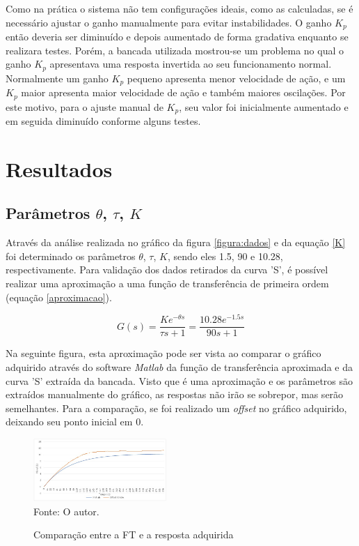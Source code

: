 \documentclass[12 pt,conference]{IEEEtran}
\begin{document}
    Como na prática o sistema não tem configurações ideais, como as calculadas, se é necessário ajustar o ganho manualmente para evitar instabilidades. O ganho $K_p$ então deveria ser diminuído e depois aumentado de forma gradativa enquanto se realizara testes. Porém, a bancada utilizada mostrou-se um problema no qual o ganho $K_p$ apresentava uma resposta invertida ao seu funcionamento normal. Normalmente um ganho $K_p$ pequeno apresenta menor velocidade de ação, e um $K_p$ maior apresenta maior velocidade de ação e também maiores oscilações. Por este motivo, para o ajuste manual de $K_p$, seu valor foi inicialmente aumentado e em seguida diminuído conforme alguns testes.

        
    \section{Resultados}
    
    \subsection{Parâmetros $\theta$, $\tau$, $K$}
    Através da análise realizada no gráfico da figura \ref{figura:dados} e da equação \ref{K} foi determinado os parâmetros $\theta$, $\tau$, $K$, sendo eles 1.5, 90 e 10.28, respectivamente. Para validação dos dados retirados da curva 'S', é possível realizar uma aproximação a uma função de transferência de primeira ordem (equação \ref{aproximacao}). 
    
    \begin{equation}
        G(s) = \frac{Ke^{-\theta s}}{\tau s + 1} = \frac{10.28e^{-1.5 s}}{90s + 1}
        \label{aproximacao}
    \end{equation}
    
    Na seguinte figura, esta aproximação pode ser vista ao comparar o gráfico adquirido através do software \textit{Matlab} da função de transferência aproximada e da curva 'S' extraída da bancada. Visto que é uma aproximação e os parâmetros são extraídos manualmente do gráfico, as respostas não irão se sobrepor, mas serão semelhantes. Para a comparação, se foi realizado um \textit{offset} no gráfico adquirido, deixando seu ponto inicial em 0.
    
    \begin{figure}[!http]
       \centering
        \caption{Comparação entre a FT e a resposta adquirida}
        \includegraphics[width=0.45\textwidth]{imagens/Aproximacao.jpeg}\\ 
        Fonte: O autor.
        \label{figura:aprox}
    \end{figure}
    
\end{document}
